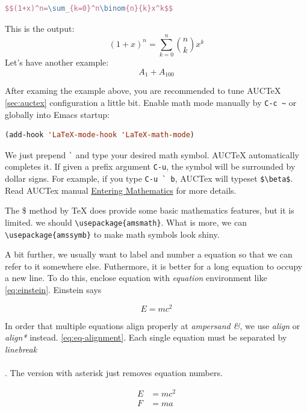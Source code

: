 \begin{lstlisting}[language=TeX,caption={Equation in new line},label={lst:equation-in-new-line}]
$$(1+x)^n=\sum_{k=0}^n\binom{n}{k}x^k$$
\end{lstlisting}

This is the output:
$$(1+x)^n=\sum_{k=0}^n\binom{n}{k}x^k$$
Let's have another example:
$$A_1+A_{100}$$

After examing the example above, you are recommended to tune
AUCTeX \ref{sec:auctex} configuration a little bit. Enable math
mode manually by \verb|C-c ~| or globally into Emacs startup:

\begin{lstlisting}[language=Lisp,caption={\LaTeX{} Math Mode},label={lst:latex-math-mode}]
(add-hook 'LaTeX-mode-hook 'LaTeX-math-mode)
\end{lstlisting}

We just prepend \verb|`| and type your desired math symbol. AUCTeX
automatically completes it. If given a prefix argument \verb|C-u|,
the symbol will be surrounded by dollar signs. For example, if you
type \verb|C-u ` b|, AUCTex will typeset \verb|$\beta$|. Read
AUCTex manual
\href{https://www.gnu.org/software/auctex/manual/auctex/Mathematics.html}{Entering
  Mathematics} for more details.

The \$ method by \TeX{} does provide some basic mathematics
features, but it is limited. we should
\verb|\usepackage{amsmath}|. What is more, we can
\verb|\usepackage{amssymb}| to make math symbols look shiny.

A bit further, we usually want to label and number a equation so
that we can refer to it somewhere else. Futhermore, it is better
for a long equation to occupy a new line. To do this, enclose
equation with \textit{equation} environment like
\eqref{eq:einstein}. Einstein says

\begin{equation}
  \label{eq:einstein}
  E = mc^2
\end{equation}

In order that multiple equations align properly at
\textit{ampersand \&}, we use \textit{align} or \textit{align*}
instead.  \eqref{eq:eq-alignment}. Each single equation must be
separated by \textit{linebreak \\\\}. The version with asterisk
just removes equation numbers.

\begin{align}
  \label{eq:multi-eqs}
  E &= mc^2 \\
  F &= ma
\end{align}


